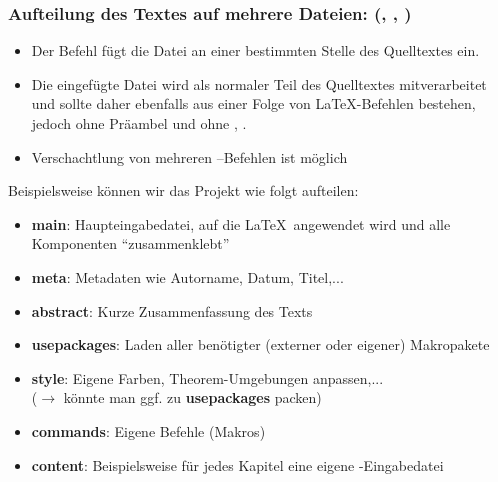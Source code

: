 \subsubsection{Aufteilung des Textes auf mehrere Dateien:  (, , )}
\begin{itemize}
	\item Der Befehl  fügt die Datei  an einer bestimmten Stelle des Quelltextes ein.
	\item Die eingefügte Datei wird als normaler Teil des Quelltextes mitverarbeitet und sollte daher ebenfalls aus einer Folge von LaTeX-Befehlen bestehen, jedoch ohne Präambel und ohne , .
	\item Verschachtlung von mehreren --Befehlen ist möglich
\end{itemize}
Beispielsweise können wir das Projekt wie folgt aufteilen:
\begin{itemize}
	\item \textbf{main}: Haupteingabedatei, auf die \LaTeX~angewendet wird und alle Komponenten ``zusammenklebt''
	\item \textbf{meta}: Metadaten wie Autorname, Datum, Titel,...
	\item \textbf{abstract}: Kurze Zusammenfassung des Texts
	\item \textbf{usepackages}: Laden aller benötigter (externer oder eigener) Makropakete
	\item \textbf{style}: Eigene Farben, Theorem-Umgebungen anpassen,...\\
		($\to$ könnte man ggf. zu \textbf{usepackages} packen)
	\item \textbf{commands}: Eigene Befehle (Makros)
	\item \textbf{content}: Beispielsweise für jedes Kapitel eine eigene -Eingabedatei
\end{itemize}



